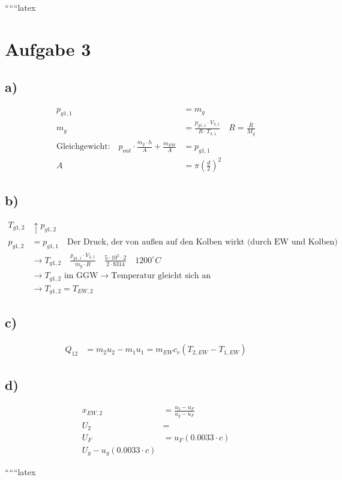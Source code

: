 
``````latex


\section*{Aufgabe 3}

\subsection*{a)}
\begin{align*}
    p_{g1,1} &= m_g \\
    m_g &= \frac{p_{g1,1} \cdot V_{3,1}}{R \cdot T_{3,1}} \quad R = \frac{\bar{R}}{M_g} \\
    \text{Gleichgewicht:} \quad p_{out} \cdot \frac{m_g \cdot h}{A} + \frac{m_{EW}}{A} &= p_{g1,1} \\
    A &= \pi \left( \frac{d}{2} \right)^2
\end{align*}

\subsection*{b)}
\begin{align*}
    T_{g1,2} &\uparrow p_{g1,2} \\
    p_{g1,2} &= p_{g1,1} \quad \text{Der Druck, der von außen auf den Kolben wirkt (durch EW und Kolben) verändert sich nicht.} \\
    &\rightarrow T_{g1,2} \quad \frac{p_{g1,1} \cdot V_{3,1}}{m_g \cdot R} \quad \frac{5 \cdot 10^5 \cdot 2}{2 \cdot 8314} \quad 1200^\circ C \\
    &\rightarrow T_{g1,2} \text{ im GGW} \rightarrow \text{Temperatur gleicht sich an} \\
    &\rightarrow T_{g1,2} = T_{EW,2}
\end{align*}

\subsection*{c)}
\begin{align*}
    Q_{12} &= m_2 u_2 - m_1 u_1 = m_{EW} c_v (T_{2,EW} - T_{1,EW})
\end{align*}

\subsection*{d)}
\begin{align*}
    x_{EW,2} &= \frac{u_2 - u_F}{u_g - u_F} \\
    U_2 &= \\
    U_F &= u_F (0.0033 \cdot c) \\
    U_g - u_g (0.0033 \cdot c)
\end{align*}

``````latex


